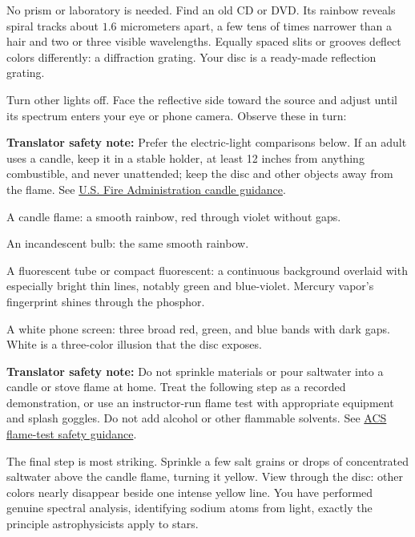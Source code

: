 \begin{experiment}
No prism or laboratory is needed. Find an old CD or DVD. Its rainbow reveals spiral tracks about \(1.6\) micrometers apart, a few tens of times narrower than a hair and two or three visible wavelengths. Equally spaced slits or grooves deflect colors differently: a diffraction grating. Your disc is a ready-made reflection grating.

Turn other lights off. Face the reflective side toward the source and adjust until its spectrum enters your eye or phone camera. Observe these in turn:

\textbf{Translator safety note:} Prefer the electric-light comparisons below. If an adult uses a candle, keep it in a stable holder, at least 12 inches from anything combustible, and never unattended; keep the disc and other objects away from the flame. See \href{https://www.usfa.fema.gov/prevention/home-fires/prevent-fires/candle/}{U.S. Fire Administration candle guidance}.

A candle flame: a smooth rainbow, red through violet without gaps.

An incandescent bulb: the same smooth rainbow.

A fluorescent tube or compact fluorescent: a continuous background overlaid with especially bright thin lines, notably green and blue-violet. Mercury vapor's fingerprint shines through the phosphor.

A white phone screen: three broad red, green, and blue bands with dark gaps. White is a three-color illusion that the disc exposes.

\textbf{Translator safety note:} Do not sprinkle materials or pour saltwater into a candle or stove flame at home. Treat the following step as a recorded demonstration, or use an instructor-run flame test with appropriate equipment and splash goggles. Do not add alcohol or other flammable solvents. See \href{https://institute.acs.org/acs-center/lab-safety/education-training/safer-experiments/flame-test.html}{ACS flame-test safety guidance}.

The final step is most striking. Sprinkle a few salt grains or drops of concentrated saltwater above the candle flame, turning it yellow. View through the disc: other colors nearly disappear beside one intense yellow line. You have performed genuine spectral analysis, identifying sodium atoms from light, exactly the principle astrophysicists apply to stars.
\end{experiment}

